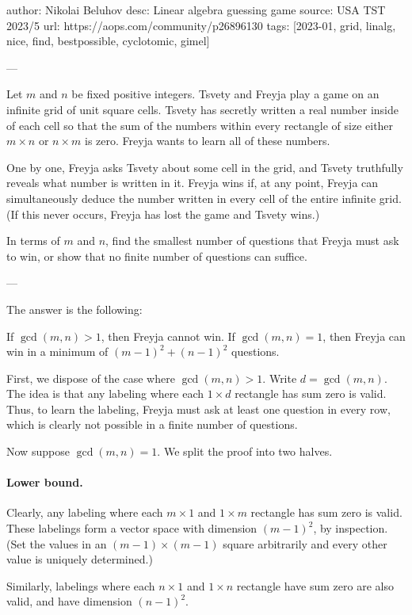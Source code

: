author: Nikolai Beluhov
desc: Linear algebra guessing game
source: USA TST 2023/5
url: https://aops.com/community/p26896130
tags: [2023-01, grid, linalg, nice, find, bestpossible, cyclotomic, gimel]

---

Let $m$ and $n$ be fixed positive integers.
Tsvety and Freyja play a game on an infinite grid of unit square cells.
Tsvety has secretly written a real number inside of each cell so that
the sum of the numbers within every rectangle of size
either $m \times n$ or $n \times m$ is zero.
Freyja wants to learn all of these numbers.

One by one, Freyja asks Tsvety about some cell in the grid,
and Tsvety truthfully reveals what number is written in it.
Freyja wins if, at any point, Freyja can simultaneously deduce
the number written in every cell of the entire infinite grid.
(If this never occurs, Freyja has lost the game and Tsvety wins.)

In terms of $m$ and $n$, find the smallest number of
questions that Freyja must ask to win,
or show that no finite number of questions can suffice.

---

The answer is the following:
\begin{itemize}
  \ii If $\gcd(m, n) > 1$, then Freyja cannot win.
  \ii If $\gcd(m, n) = 1$, then Freyja
  can win in a minimum of $(m-1)^2 + (n-1)^2$ questions.
\end{itemize}

First, we dispose of the case where $\gcd(m, n) > 1$.
Write $d = \gcd(m, n)$.
The idea is that any labeling where each $1 \times d$ rectangle has sum zero is valid.
Thus, to learn the labeling, Freyja must ask at least one question in every row,
which is clearly not possible in a finite number of questions.

Now suppose $\gcd(m, n) = 1$.
We split the proof into two halves.

\paragraph{Lower bound.}
Clearly, any labeling where each $m \times 1$ and $1 \times m$ rectangle has sum zero is valid.
These labelings form a vector space with dimension $(m-1)^2$, by inspection.
(Set the values in an $(m-1)\times (m-1)$ square arbitrarily and every other
value is uniquely determined.)

Similarly, labelings where each $n \times 1$ and $1 \times n$ rectangle have sum
zero are also valid, and have dimension $(n-1)^2$.

